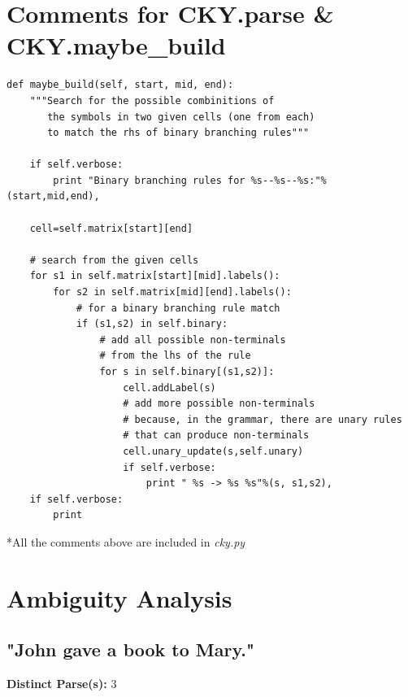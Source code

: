\documentclass{article}
\begin{document}
\hfill \break

\section{Comments for CKY.parse \& CKY.maybe\_build}
\begin{lstlisting}
def maybe_build(self, start, mid, end):
	"""Search for the possible combinitions of 
	   the symbols in two given cells (one from each) 
	   to match the rhs of binary branching rules"""
	   
	if self.verbose:
		print "Binary branching rules for %s--%s--%s:"%(start,mid,end),
	
	cell=self.matrix[start][end]
	
	# search from the given cells
	for s1 in self.matrix[start][mid].labels():
		for s2 in self.matrix[mid][end].labels():
			# for a binary branching rule match
			if (s1,s2) in self.binary:
				# add all possible non-terminals
				# from the lhs of the rule
				for s in self.binary[(s1,s2)]:
					cell.addLabel(s)
					# add more possible non-terminals 
					# because, in the grammar, there are unary rules 
					# that can produce non-terminals
					cell.unary_update(s,self.unary)
					if self.verbose:
						print " %s -> %s %s"%(s, s1,s2),
	if self.verbose:
		print 

\end{lstlisting}
\hfill \break

*All the comments above are included in \textit{cky.py}

\hfill \break


\section{Ambiguity Analysis}

\subsection{"John gave a book to Mary."}

\textbf{Distinct Parse(s):} 3\\
\end{document}
